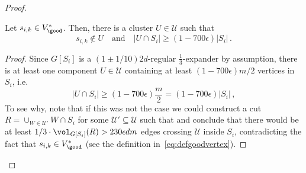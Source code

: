\begin{proof}
	\begin{claim}
		\label{claim:separateclusters}
		Let $s_{i,k} \in V^*_{{\good}} $. Then, there is a cluster $U \in \mathcal{U}$ such that
		\begin{equation*}
			s_{i,k} \notin U \quad \text{and} \quad |U\cap S_i| \ge \left(1-700{\epsilon}\right)  |S_i| \, .
		\end{equation*}
	\end{claim}
\begin{proof}
	Since $G[S_i]$ is a $(1 \pm 1/10)2d$-regular $\frac{1}{3}$-expander by assumption, there is at least one component $U \in \mathcal{U}$ containing at least $(1-700\epsilon)m/2$ vertices in $S_i$, i.e.
	\begin{equation}
		\label{eq:badcomp}
		|U \cap S_i| \ge \left(1-700{\epsilon}\right) \frac{m}{2}  = \left(1-700{\epsilon}\right)  |S_i| \, ,
	\end{equation}
	To see why, note that if this was not the case we could construct a cut $R = \cup_{W \in \mathcal{U}'} W \cap S_i$ for some $\mathcal{U}' \subseteq \mathcal{U}$ such that  and conclude that there would be at least $ 1/3\cdot \vol_{G[S_i]}(R) > 230\epsilon dm$ edges crossing $\mathcal{U}$ inside $S_i$, contradicting the fact that $s_{i,k} \in V^*_{{\good}} $ (see the definition in~\eqref{eq:defgoodvertex}).
	

\end{proof}
\end{proof}
